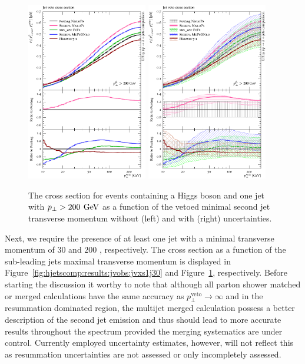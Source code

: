 \begin{figure}[t!]
  \centering
  \includegraphics[width=0.47\textwidth]{figures/hjetscomp_u_xs_jet_veto_j1_200.pdf}
  \hfill
  \includegraphics[width=0.47\textwidth]{figures/hjetscomp_xs_jet_veto_j1_200.pdf}
  \caption{
    The cross section for events containing a Higgs boson 
    and one jet with $p_\perp>200\,\text{\:GeV}$ as a function of
    the vetoed minimal second jet transverse momentum without
    (left) and with (right) uncertainties.
    \label{fig:hjetscomp:results:jvobs:jvxs1j200}
  }
\end{figure}

Next, we require the presence of at least one jet with 
a minimal transverse momentum of $30$ and $200$ \gev, respectively. 
The cross section as a function of 
the sub-leading jets maximal transverse momentum is displayed in 
Figure~\ref{fig:hjetscomp:results:jvobs:jvxs1j30} and 
Figure~\ref{fig:hjetscomp:results:jvobs:jvxs1j200}, respectively. 
Before starting the discussion it worthy to note that although all parton 
shower matched or merged calculations have the same accuracy as 
$p_\perp^\text{veto}\to\infty$ and in the resummation dominated region, 
the multijet merged calculation possess a better description of the 
second jet emission and thus should lead to more accurate results 
throughout the spectrum provided the merging systematics are under control. 
Currently employed uncertainty estimates, however, will not reflect this 
as resummation uncertainties are not assessed or only incompletely assessed.

